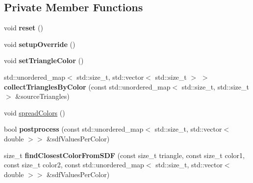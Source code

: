 \subsection*{Private Member Functions}
\begin{DoxyCompactItemize}
\item 
\mbox{\label{classpepr3d_1_1_semiautomatic_segmentation_a9e3e327658d9a422cf5e68d14cfa25f0}} 
void {\bfseries reset} ()
\item 
\mbox{\label{classpepr3d_1_1_semiautomatic_segmentation_a0a41d3c0fd80854417323e16010f7b67}} 
void {\bfseries setup\+Override} ()
\item 
\mbox{\label{classpepr3d_1_1_semiautomatic_segmentation_a98d9b835dfb7d5cb98abc6caa1a75f8e}} 
void {\bfseries set\+Triangle\+Color} ()
\item 
\mbox{\label{classpepr3d_1_1_semiautomatic_segmentation_ae7a57a2621edd7b2aa30ccf0b313b34f}} 
std\+::unordered\+\_\+map$<$ std\+::size\+\_\+t, std\+::vector$<$ std\+::size\+\_\+t $>$ $>$ {\bfseries collect\+Triangles\+By\+Color} (const std\+::unordered\+\_\+map$<$ std\+::size\+\_\+t, std\+::size\+\_\+t $>$ \&source\+Triangles)
\item 
void \mbox{\hyperlink{classpepr3d_1_1_semiautomatic_segmentation_a163c52c9b1e672ba76141923ab87eb0a}{spread\+Colors}} ()
\item 
\mbox{\label{classpepr3d_1_1_semiautomatic_segmentation_acbdbc4dfe19c562f9212eded1556f1fd}} 
bool {\bfseries postprocess} (const std\+::unordered\+\_\+map$<$ std\+::size\+\_\+t, std\+::vector$<$ double $>$$>$ \&sdf\+Values\+Per\+Color)
\item 
\mbox{\label{classpepr3d_1_1_semiautomatic_segmentation_a66b87e3be75a6d3becc1e01c6025abb3}} 
size\+\_\+t {\bfseries find\+Closest\+Color\+From\+S\+DF} (const size\+\_\+t triangle, const size\+\_\+t color1, const size\+\_\+t color2, const std\+::unordered\+\_\+map$<$ std\+::size\+\_\+t, std\+::vector$<$ double $>$$>$ \&sdf\+Values\+Per\+Color)
\end{DoxyCompactItemize}
